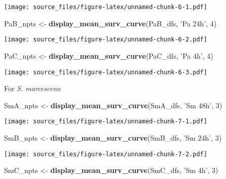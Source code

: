 \documentclass[]{article}
\newenvironment{Shaded}{\begin{snugshade}}{\end{snugshade}}
\newcommand{\KeywordTok}[1]{\textcolor[rgb]{0.13,0.29,0.53}{\textbf{#1}}}
\newcommand{\DecValTok}[1]{\textcolor[rgb]{0.00,0.00,0.81}{#1}}
\newcommand{\StringTok}[1]{\textcolor[rgb]{0.31,0.60,0.02}{#1}}
\newcommand{\NormalTok}[1]{#1}
\begin{document}
\texttt{[image: source\_files/figure-latex/unnamed-chunk-6-1.pdf]}

\begin{Shaded}
\begin{Highlighting}[]
\NormalTok{PaB_npts <-}\StringTok{ }\KeywordTok{display_mean_surv_curve}\NormalTok{(PaB_dfs, }\StringTok{'Pa 24h'}\NormalTok{, }\DecValTok{4}\NormalTok{)}
\end{Highlighting}
\end{Shaded}

\texttt{[image: source\_files/figure-latex/unnamed-chunk-6-2.pdf]}

\begin{Shaded}
\begin{Highlighting}[]
\NormalTok{PaC_npts <-}\StringTok{ }\KeywordTok{display_mean_surv_curve}\NormalTok{(PaC_dfs, }\StringTok{'Pa 4h'}\NormalTok{, }\DecValTok{4}\NormalTok{)}
\end{Highlighting}
\end{Shaded}

\texttt{[image: source\_files/figure-latex/unnamed-chunk-6-3.pdf]}

For \emph{S. marcescens}:

\begin{Shaded}
\begin{Highlighting}[]
\NormalTok{SmA_npts <-}\StringTok{ }\KeywordTok{display_mean_surv_curve}\NormalTok{(SmA_dfs, }\StringTok{'Sm 48h'}\NormalTok{, }\DecValTok{3}\NormalTok{)}
\end{Highlighting}
\end{Shaded}

\texttt{[image: source\_files/figure-latex/unnamed-chunk-7-1.pdf]}

\begin{Shaded}
\begin{Highlighting}[]
\NormalTok{SmB_npts <-}\StringTok{ }\KeywordTok{display_mean_surv_curve}\NormalTok{(SmB_dfs, }\StringTok{'Sm 24h'}\NormalTok{, }\DecValTok{3}\NormalTok{)}
\end{Highlighting}
\end{Shaded}

\texttt{[image: source\_files/figure-latex/unnamed-chunk-7-2.pdf]}

\begin{Shaded}
\begin{Highlighting}[]
\NormalTok{SmC_npts <-}\StringTok{ }\KeywordTok{display_mean_surv_curve}\NormalTok{(SmC_dfs, }\StringTok{'Sm 4h'}\NormalTok{, }\DecValTok{3}\NormalTok{)}
\end{Highlighting}
\end{Shaded}
\end{document}
